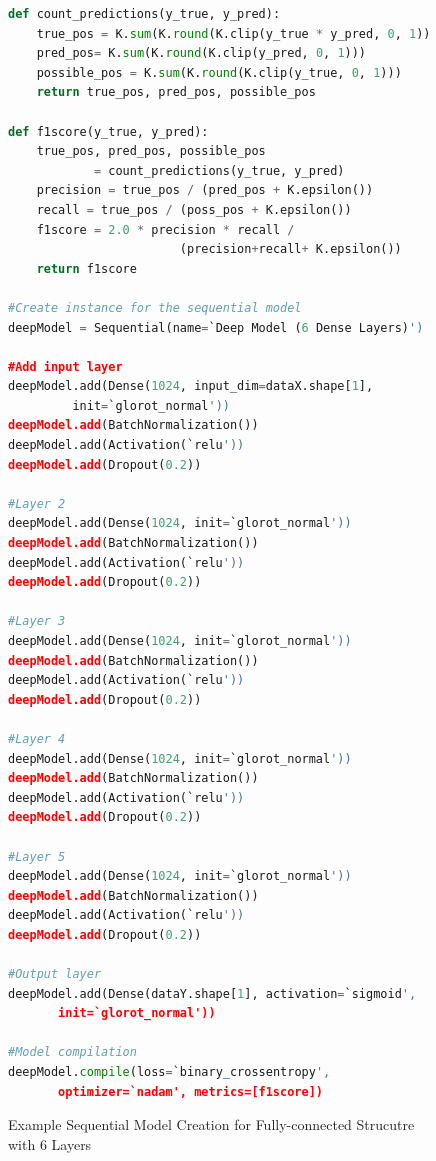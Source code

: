 \documentclass[runningheads,a4paper]{IEEEtran}
\begin{document}
\begin{figure}
\begin{lstlisting}[language=Python,basicstyle=\scriptsize, frame=single]
def count_predictions(y_true, y_pred):
    true_pos = K.sum(K.round(K.clip(y_true * y_pred, 0, 1)))
    pred_pos= K.sum(K.round(K.clip(y_pred, 0, 1)))
    possible_pos = K.sum(K.round(K.clip(y_true, 0, 1)))
    return true_pos, pred_pos, possible_pos

def f1score(y_true, y_pred):
    true_pos, pred_pos, possible_pos
            = count_predictions(y_true, y_pred)
    precision = true_pos / (pred_pos + K.epsilon())
    recall = true_pos / (poss_pos + K.epsilon())
    f1score = 2.0 * precision * recall / 
                        (precision+recall+ K.epsilon())
    return f1score

#Create instance for the sequential model
deepModel = Sequential(name=`Deep Model (6 Dense Layers)')

#Add input layer
deepModel.add(Dense(1024, input_dim=dataX.shape[1],
         init=`glorot_normal'))
deepModel.add(BatchNormalization())
deepModel.add(Activation(`relu'))
deepModel.add(Dropout(0.2))

#Layer 2
deepModel.add(Dense(1024, init=`glorot_normal'))
deepModel.add(BatchNormalization())
deepModel.add(Activation(`relu'))
deepModel.add(Dropout(0.2))

#Layer 3
deepModel.add(Dense(1024, init=`glorot_normal'))
deepModel.add(BatchNormalization())
deepModel.add(Activation(`relu'))
deepModel.add(Dropout(0.2))

#Layer 4
deepModel.add(Dense(1024, init=`glorot_normal'))
deepModel.add(BatchNormalization())
deepModel.add(Activation(`relu'))
deepModel.add(Dropout(0.2))

#Layer 5
deepModel.add(Dense(1024, init=`glorot_normal'))
deepModel.add(BatchNormalization())
deepModel.add(Activation(`relu'))
deepModel.add(Dropout(0.2))

#Output layer
deepModel.add(Dense(dataY.shape[1], activation=`sigmoid', 
       init=`glorot_normal'))

#Model compilation
deepModel.compile(loss=`binary_crossentropy', 
       optimizer=`nadam', metrics=[f1score])
\end{lstlisting}
\caption{Example Sequential Model Creation for Fully-connected Strucutre with 6 Layers}
\label{modelCode}
\end{figure}
\end{document}
